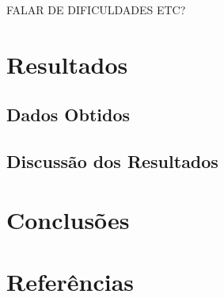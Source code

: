 \documentclass[12pt]{article}
\begin{document}
FALAR DE DIFICULDADES ETC?

\section{Resultados} \label{sec:resultados}
\subsection{Dados Obtidos} \label{sub:dados}
\subsection{Discussão dos Resultados} \label{sub:discussao}
\section{Conclusões} \label{sec:conclusoes}
\section{Referências} \label{sec:referencias}




\end{document}
